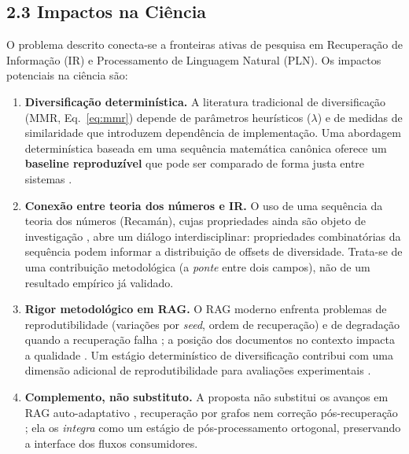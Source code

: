 \subsection*{2.3 Impactos na Ciência}

 O problema descrito conecta-se a fronteiras ativas de pesquisa em
Recuperação de Informação (IR) e Processamento de Linguagem Natural (PLN). Os
impactos potenciais na ciência são:

\begin{enumerate}[label=\arabic*.]
  \item \textbf{Diversificação determinística.} A literatura tradicional de
        diversificação (MMR, Eq.~\ref{eq:mmr}) depende de parâmetros heurísticos
        ($\lambda$) e de medidas de similaridade que introduzem dependência de
        implementação. Uma abordagem determinística baseada em uma sequência
        matemática canônica oferece um \textbf{baseline reproduzível} que pode ser
        comparado de forma justa entre sistemas \cite{CarbonellGoldstein1998MMR}.
  \item \textbf{Conexão entre teoria dos números e IR.} O uso de uma sequência da
        teoria dos números (Recamán), cujas propriedades ainda são objeto de
        investigação \cite{Alekseyev2022RecamanCousins}, abre um diálogo
        interdisciplinar: propriedades combinatórias da sequência podem informar a
        distribuição de offsets de diversidade. Trata-se de uma contribuição
        metodológica (a \emph{ponte} entre dois campos), não de um resultado
        empírico já validado.
  \item \textbf{Rigor metodológico em RAG.} O RAG moderno enfrenta problemas de
        reprodutibilidade (variações por \emph{seed}, ordem de recuperação) e de
        degradação quando a recuperação falha \cite{Yan2024CRAG}; a posição dos
        documentos no contexto impacta a qualidade \cite{Liu2024LostMiddle}. Um
        estágio determinístico de diversificação contribui com uma dimensão
        adicional de reprodutibilidade para avaliações experimentais
        \cite{Ram2023RetrievalAugmented}.
  \item \textbf{Complemento, não substituto.} A proposta não substitui os avanços
        em RAG auto-adaptativo \cite{Jeong2024AdaptiveRAG}, recuperação por grafos
        \cite{Edge2024GraphRAG} nem correção pós-recuperação \cite{Yan2024CRAG};
        ela os \emph{integra} como um estágio de pós-processamento ortogonal,
        preservando a interface dos fluxos consumidores.
\end{enumerate}

